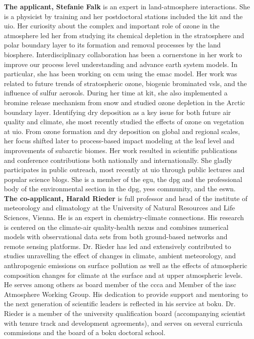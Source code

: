 \glsresetall
\textbf{The applicant, Stefanie Falk} is an expert in land-atmosphere interactions. She is a physicist by training and her postdoctoral stations included the \gls{kit} and the \gls{uio}. Her curiosity about the complex and important role of ozone in the atmosphere led her from studying its chemical depletion in the stratosphere and polar boundary layer to its formation and removal processes by the land biosphere. Interdisciplinary collaboration has been a cornerstone in her work to improve our process level understanding and advance earth system models. In particular, she has been working on \gls{ccm} using the \gls{emac} model. Her work was related to future trends of stratospheric ozone, biogenic brominated \gls{vsls}, and the influence of sulfur aerosols. During her time at \gls{kit}, she also implemented a bromine release mechanism from snow and studied ozone depletion in the Arctic boundary layer. Identifying dry deposition as a key issue for both future air quality and climate, she most recently studied the effects of ozone on vegetation at \gls{uio}. From ozone formation and dry deposition on global and regional scales, her focus shifted later to process-based impact modeling at the leaf level and improvements of subarctic biomes. Her work resulted in scientific publications and conference contributions both nationally and internationally. She gladly participates in public outreach, most recently at \gls{uio} through public lectures and popular science blogs. She is a member of the \gls{egu}, the \gls{dpg} and the professional body of the environmental section in the \gls{dpg}, \gls{yess} community, and the \gls{eswn}.\\

\textbf{The co-applicant, Harald Rieder} is full professor and head of the institute of meteorology and climatology at the University of Natural Resources and Life Sciences, Vienna. He is an expert in chemistry-climate connections. His research is centered on the climate-air quality-health nexus and combines numerical models with observational data sets from both ground-based networks and remote sensing platforms. Dr. Rieder has led and extensively contributed to studies unravelling the effect of changes in climate, ambient meteorology, and anthropogenic emissions on surface pollution as well as the effects of atmospheric composition changes for climate at the surface and at upper atmospheric levels. He serves among others as board member of the \gls{ccca} and Member of the \gls{iasc} Atmosphere Working Group. His dedication to provide support and mentoring to the next generation of scientific leaders is reflected in his service at \gls{boku}. Dr. Rieder is a member of the university qualification board (accompanying scientist with tenure track and development agreements), and serves on several curricula commissions and the board of a \gls{boku} doctoral school. 
